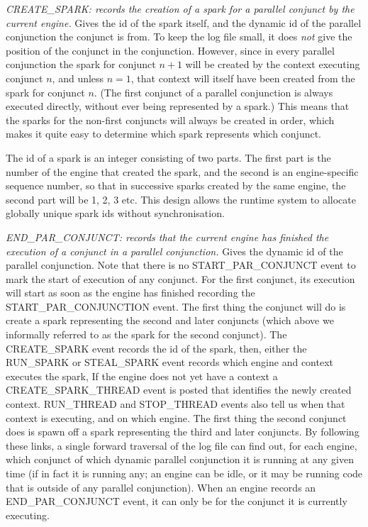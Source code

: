 \emph{CREATE\_SPARK: records the creation of a spark
for a parallel conjunct by the current engine.}
Gives the id of the spark itself,
and the dynamic id of the parallel conjunction the conjunct is from.
To keep the log file small,
it does \emph{not} give the position of the conjunct in the conjunction.
However, since in every parallel conjunction
the spark for conjunct $n+1$
will be created by the context executing conjunct $n$,
and unless $n=1$, that context will itself have been created
from the spark for conjunct $n$.
(The first conjunct of a parallel conjunction is always executed directly,
without ever being represented by a spark.)
This means that the sparks for the non-first conjuncts
will always be created in order,
which makes it quite easy to determine which spark represents which conjunct.

The id of a spark is an integer consisting of two parts.
The first part is the number of the engine that created the spark,
and the second is an engine-specific sequence number,
so that in successive sparks created by the same engine,
the second part will be 1, 2, 3 etc.
This design allows the runtime system
to allocate globally unique spark ids without synchronisation.

\emph{END\_PAR\_CONJUNCT:
records that the current engine
has finished the execution of a conjunct in a parallel conjunction.}
Gives the dynamic id of the parallel conjunction.
Note that there is no START\_PAR\_CONJUNCT event
to mark the start of execution of any conjunct.
For the first conjunct, its execution will start
as soon as the engine has finished recording the START\_PAR\_CONJUNCTION event.
The first thing the conjunct will do is create a spark
representing the second and later conjuncts
(which above we informally referred to as the spark for the second conjunct).
The CREATE\_SPARK event records the id of the spark,
then, either the RUN\_SPARK or STEAL\_SPARK event records which engine and context
executes the spark,
If the engine does not yet have a context a CREATE\_SPARK\_THREAD event is posted
that identifies the newly created context.
RUN\_THREAD and STOP\_THREAD events
also tell us when that context is executing, and on which engine.
The first thing the second conjunct does is spawn off a spark
representing the third and later conjuncts.
By following these links,
a single forward traversal of the log file can find out,
for each engine, which conjunct of which dynamic parallel conjunction
it is running at any given time
(if in fact it is running any;
an engine can be idle,
or it may be running code that is outside of any parallel conjunction).
When an engine records an END\_PAR\_CONJUNCT event,
it can only be for the conjunct it is currently executing.

